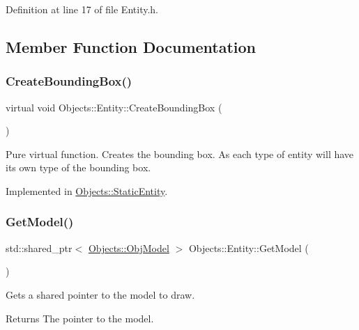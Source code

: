 Definition at line 17 of file Entity.\+h.



\subsection{Member Function Documentation}
\mbox{\label{class_objects_1_1_entity_a3fc51fcad3f731410589f7ab0e3dbe7e}} 
\subsubsection{\texorpdfstring{Create\+Bounding\+Box()}{CreateBoundingBox()}}
{\footnotesize\ttfamily virtual void Objects\+::\+Entity\+::\+Create\+Bounding\+Box (\begin{DoxyParamCaption}{ }\end{DoxyParamCaption})\hspace{0.3cm}{\ttfamily [pure virtual]}}

Pure virtual function. Creates the bounding box. As each type of entity will have its own type of the bounding box. 

Implemented in \hyperlink{class_objects_1_1_static_entity_ae4b1ecdb50494a6d784b81803041ed52}{Objects\+::\+Static\+Entity}.

\mbox{\label{class_objects_1_1_entity_ab11c284129ded400940d924965c70399}} 
\subsubsection{\texorpdfstring{Get\+Model()}{GetModel()}}
{\footnotesize\ttfamily std\+::shared\+\_\+ptr$<$ \hyperlink{class_objects_1_1_obj_model}{Objects\+::\+Obj\+Model} $>$ Objects\+::\+Entity\+::\+Get\+Model (\begin{DoxyParamCaption}{ }\end{DoxyParamCaption})}

Gets a shared pointer to the model to draw. \begin{DoxyReturn}{Returns}
The pointer to the model. 
\end{DoxyReturn}


